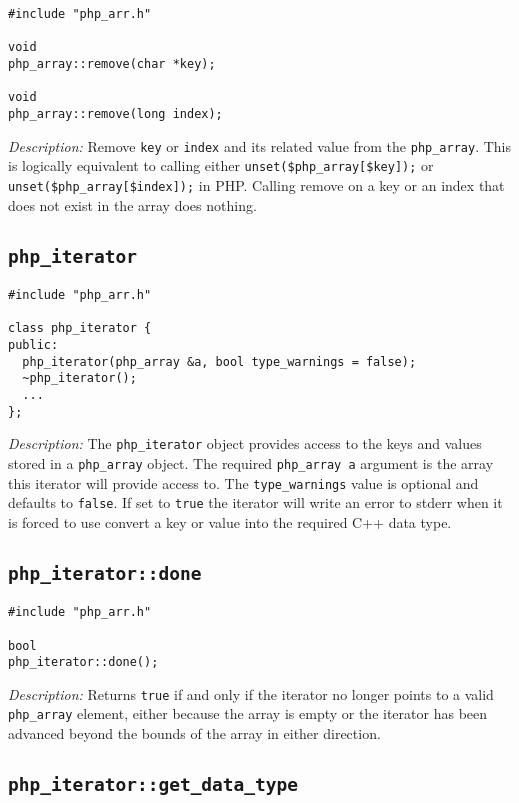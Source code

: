 \documentclass[11pt,titlepage]{article}
\begin{document}
\begin{verbatim}
#include "php_arr.h"

void 
php_array::remove(char *key);

void 
php_array::remove(long index);
\end{verbatim}

\emph{Description:} Remove \verb|key| or \verb|index| and its related value from the \verb|php_array|. This is logically equivalent to calling either \verb|unset($php_array[$key]);| or \verb|unset($php_array[$index]);| in PHP. Calling remove on a key or an index that does not exist in the array does nothing.


\subsection{\texttt{php\_iterator}}

\begin{verbatim}
#include "php_arr.h"

class php_iterator {
public:
  php_iterator(php_array &a, bool type_warnings = false);
  ~php_iterator();
  ...
};
\end{verbatim}

\emph{Description:} The \verb|php_iterator| object provides access to the keys and values stored in a \verb|php_array| object. The required \verb|php_array a| argument is the array this iterator will provide access to. The \verb|type_warnings| value is optional and defaults to \verb|false|. If set to \verb|true| the iterator will write an error to stderr when it is forced to use convert a key or value into the required C++ data type.


\subsection{\texttt{php\_iterator::done}}

\begin{verbatim}
#include "php_arr.h"

bool 
php_iterator::done();
\end{verbatim}

\emph{Description:} Returns \verb|true| if and only if the iterator no longer points to a valid \verb|php_array| element, either because the array is empty or the iterator has been advanced beyond the bounds of the array in either direction.


\subsection{\texttt{php\_iterator::get\_data\_type}}
\end{document}
